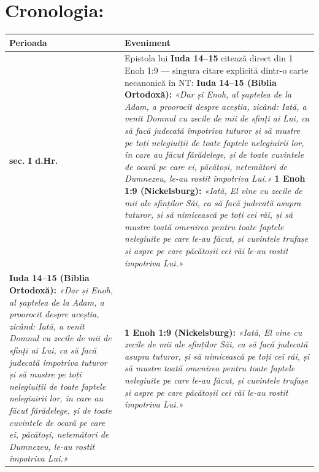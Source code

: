 \documentclass[12pt,a4paper,twoside,openany]{book}
\begin{document}
\chapter{Cronologia:}\label{cronologia}
\small
\begin{longtable}{L{4.9cm}L{10.1cm}}
\toprule
{}
\textbf{Perioada} & \textbf{Eveniment} \\
\midrule
\endhead
\textbf{sec. I d.Hr.} & Epistola lui \textbf{Iuda 14–15} citează direct din 1 Enoh 1:9 — singura citare explicită dintr-o carte necanonică în NT: \newline \textbf{Iuda 14–15 (Biblia Ortodoxă):} \newline  \newline \textit{«Dar și Enoh, al șaptelea de la Adam, a proorocit despre aceștia, zicând: Iată, a venit Domnul cu zecile de mii de sfinți ai Lui, ca să facă judecată împotriva tuturor și să mustre pe toți nelegiuiții de toate faptele nelegiuirii lor, în care au făcut fărădelege, și de toate cuvintele de ocară pe care ei, păcătoși, netemători de Dumnezeu, le-au rostit împotriva Lui.»} \newline \textbf{1 Enoh 1:9 (Nickelsburg):} \newline  \newline \textit{«Iată, El vine cu zecile de mii ale sfinților Săi, ca să facă judecată asupra tuturor, și să nimicească pe toți cei răi, și să mustre toată omenirea pentru toate faptele nelegiuite pe care le-au făcut, și cuvintele trufașe și aspre pe care păcătoșii cei răi le-au rostit împotriva Lui.»} \\
\textbf{Iuda 14–15 (Biblia Ortodoxă):} \newline  \newline \textit{«Dar și Enoh, al șaptelea de la Adam, a proorocit despre aceștia, zicând: Iată, a venit Domnul cu zecile de mii de sfinți ai Lui, ca să facă judecată împotriva tuturor și să mustre pe toți nelegiuiții de toate faptele nelegiuirii lor, în care au făcut fărădelege, și de toate cuvintele de ocară pe care ei, păcătoși, netemători de Dumnezeu, le-au rostit împotriva Lui.»} & \textbf{1 Enoh 1:9 (Nickelsburg):} \newline  \newline \textit{«Iată, El vine cu zecile de mii ale sfinților Săi, ca să facă judecată asupra tuturor, și să nimicească pe toți cei răi, și să mustre toată omenirea pentru toate faptele nelegiuite pe care le-au făcut, și cuvintele trufașe și aspre pe care păcătoșii cei răi le-au rostit împotriva Lui.»} \\

\end{longtable}
\end{document}
